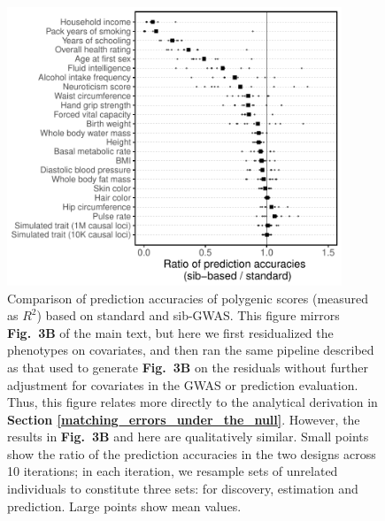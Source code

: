 \documentclass[hidelinks, 12pt]{article}
\begin{document}
\pagebreak

\begin{figure}[h]
\centering
\includegraphics[width=10cm]{./supp_figures/fig3_panelA_SI.pdf}
\caption[Comparison of prediction accuracies of polygenic scores ($R^2$) based on standard and sib-GWAS]{\small Comparison of prediction accuracies of polygenic scores (measured as $R^2$) based on standard and sib-GWAS. This figure mirrors {\bf Fig.~3B} of the main text, but here we first residualized the phenotypes on covariates, and then ran the same pipeline described as that used to generate {\bf Fig.~3B} on the residuals without further adjustment for covariates in the GWAS or prediction evaluation. Thus, this figure relates more directly to the analytical derivation in {\bf Section \ref{matching_errors_under_the_null}}. However, the results in {\bf Fig.~3B} and here are qualitatively similar. Small points show the ratio of the prediction accuracies in the two designs across 10 iterations; in each iteration, we resample sets of unrelated individuals to constitute three sets: for discovery, estimation and prediction. Large points show mean values.}
\label{fig:R2_ratio_with_residualized_phenotype}
\end{figure}

\pagebreak



\end{document}
